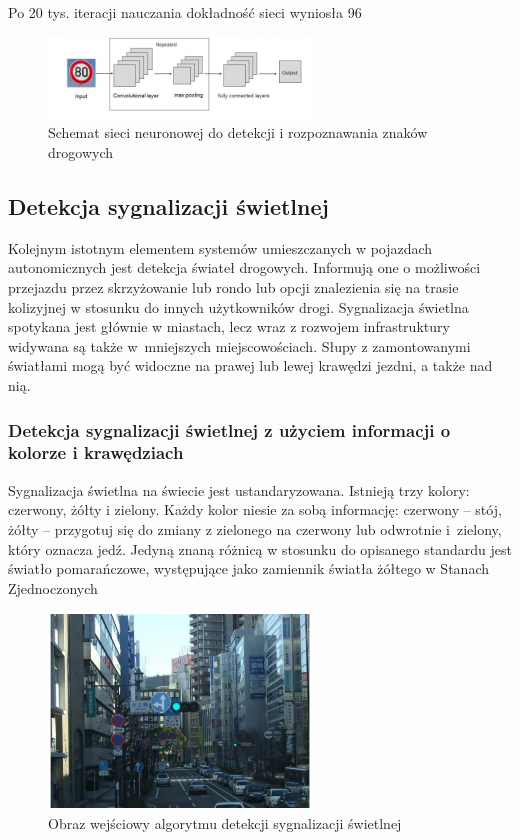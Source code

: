 Po 20 tys. iteracji nauczania dokładność sieci wyniosła 96%

\begin{figure}
  \centering
  \includegraphics[width=7cm]{img/sign_detection3_cnn_schema.png}
  \caption{Schemat sieci neuronowej do detekcji i rozpoznawania znaków drogowych\cite{T8}}
  \label{fig:sign_detection3_cnn_schema}
\end{figure}

\subsection{Detekcja sygnalizacji świetlnej}
\label{sec:tl}
Kolejnym istotnym elementem systemów umieszczanych w pojazdach autonomicznych jest detekcja świateł drogowych.
Informują one o możliwości przejazdu przez skrzyżowanie lub rondo lub opcji znalezienia się na trasie kolizyjnej w stosunku do innych użytkowników drogi. %
Sygnalizacja świetlna spotykana jest głównie w miastach, lecz wraz z rozwojem infrastruktury widywana są także w~mniejszych miejscowościach. 
Słupy z zamontowanymi światłami mogą być widoczne na prawej lub lewej krawędzi jezdni, a także nad nią.

\subsubsection{Detekcja sygnalizacji świetlnej z użyciem informacji o kolorze i krawędziach}

Sygnalizacja świetlna na świecie jest ustandaryzowana. %
Istnieją trzy kolory: czerwony, żółty i zielony. 
Każdy kolor niesie za sobą informację: czerwony -- stój, żółty -- przygotuj się do zmiany z zielonego na czerwony lub odwrotnie i~zielony, który oznacza jedź. 
Jedyną znaną różnicą w stosunku do opisanego standardu jest światło pomarańczowe, występujące jako zamiennik światła żółtego w Stanach Zjednoczonych %

\begin{figure}
  \centering
  \includegraphics[width=7cm]{img/tl_input.png}
  \caption{Obraz wejściowy algorytmu detekcji sygnalizacji świetlnej\cite{T4}}
  \label{fig:tl_input}
\end{figure}

